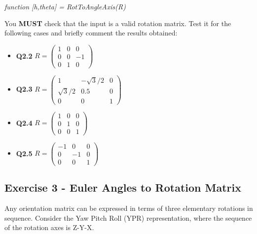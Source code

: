 \begin{center}\textit{function [h,theta] = RotToAngleAxis(R)}\end{center}


You \textbf{MUST} check that the input is a valid rotation matrix. Test it for the following cases and briefly comment the results obtained:

\begin{itemize}
    \item \textbf{Q2.2}\hspace{10mm} $R = \begin{pmatrix}
        1 & 0 & 0 \\
        0 & 0 & -1 \\
        0 & 1 & 0
    \end{pmatrix}$
    
    \item \textbf{Q2.3}\hspace{10mm} $R = \begin{pmatrix}
        1& -\sqrt{3}/2 & 0 \\
        \sqrt{3}/2 & 0.5 & 0 \\
        0 & 0 & 1
    \end{pmatrix}$
    
    \item \textbf{Q2.4}\hspace{10mm} $R = \begin{pmatrix}
        1 & 0 & 0 \\
        0 & 1 & 0 \\
        0 & 0 & 1
    \end{pmatrix}$
    
    \item \textbf{Q2.5}\hspace{10mm} $R = \begin{pmatrix}
        -1 & 0 & 0 \\
        0 & -1 & 0 \\
        0 & 0 & 1
    \end{pmatrix}$
\end{itemize}

\subsection{Exercise 3 - Euler Angles to Rotation Matrix}
Any orientation matrix can be expressed in terms of three elementary rotations in sequence. Consider the Yaw Pitch Roll (YPR) representation, where the sequence of the rotation axes is Z-Y-X.
\newline

